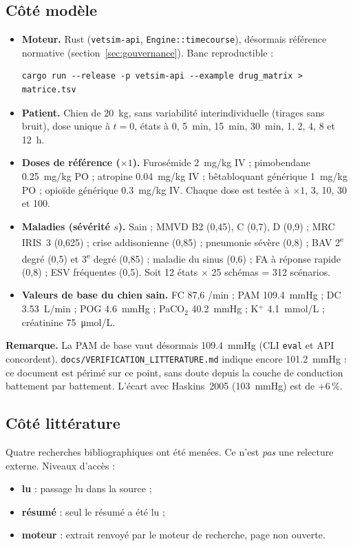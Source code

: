 \documentclass[10pt,a4paper]{article}
\newcommand{\cmd}[1]{\texttt{#1}}
\begin{document}
\subsection{Côté modèle}
\begin{itemize}
\item \textbf{Moteur.} Rust (\cmd{vetsim-api}, \cmd{Engine::timecourse}), désormais référence normative (section~\ref{sec:gouvernance}). Banc reproductible :
\begin{Verbatim}
cargo run --release -p vetsim-api --example drug_matrix > matrice.tsv
\end{Verbatim}
\item \textbf{Patient.} Chien de \SI{20}{kg}, sans variabilité interindividuelle (tirages sans bruit), dose unique à $t=0$, états à 0, 5~min, 15~min, 30~min, 1, 2, 4, 8 et 12~h.
\item \textbf{Doses de référence ($\times 1$).} Furosémide \SI{2}{mg/kg} IV ; pimobendane \SI{0,25}{mg/kg} PO ; atropine \SI{0,04}{mg/kg} IV ; bêtabloquant générique \SI{1}{mg/kg} PO ; opioïde générique \SI{0,3}{mg/kg} IV. Chaque dose est testée à $\times 1$, 3, 10, 30 et 100.
\item \textbf{Maladies (sévérité $s$).} Sain ; MMVD B2 (0,45), C (0,7), D (0,9) ; MRC IRIS~3 (0,625) ; crise addisonienne (0,85) ; pneumonie sévère (0,8) ; BAV 2\textsuperscript{e} degré (0,5) et 3\textsuperscript{e} degré (0,85) ; maladie du sinus (0,6) ; FA à réponse rapide (0,8) ; ESV fréquentes (0,5). Soit 12 états $\times$ 25 schémas = 312 scénarios.
\item \textbf{Valeurs de base du chien sain.} FC 87,6 /min ; PAM \SI{109,4}{mmHg} ; DC \SI{3,53}{L/min} ; POG \SI{4,6}{mmHg} ; PaCO$_2$ \SI{40,2}{mmHg} ; K$^+$ \SI{4,1}{mmol/L} ; créatinine \SI{75}{\micro mol/L}.
\end{itemize}

\textbf{Remarque.} La PAM de base vaut désormais \SI{109,4}{mmHg} (CLI \cmd{eval} et API concordent). \cmd{docs/VERIFICATION\_LITTERATURE.md} indique encore \SI{101,2}{mmHg} : ce document est périmé sur ce point, sans doute depuis la couche de conduction battement par battement. L'écart avec Haskins~2005 (\SI{103}{mmHg}) est de $+6$\,\%.

\subsection{Côté littérature}
Quatre recherches bibliographiques ont été menées. Ce n'est \emph{pas} une relecture externe. Niveaux d'accès :
\begin{itemize}
\item \textbf{lu} : passage lu dans la source ;
\item \textbf{résumé} : seul le résumé a été lu ;
\item \textbf{moteur} : extrait renvoyé par le moteur de recherche, page non ouverte.
\end{itemize}
\end{document}
